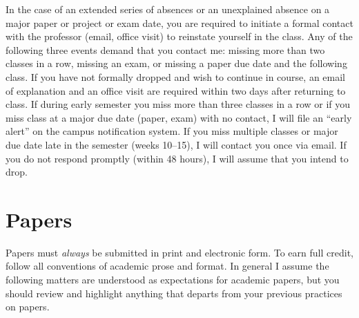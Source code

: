 \documentclass[]{article}
\begin{document}
In the case of an extended series of absences or an unexplained absence
on a major paper or project or exam date, you are required to initiate a
formal contact with the professor (email, office visit) to reinstate
yourself in the class. Any of the following three events demand that you
contact me: missing more than two classes in a row, missing an exam, or
missing a paper due date and the following class. If you have not
formally dropped and wish to continue in course, an email of explanation
and an office visit are required within two days after returning to
class. If during early semester you miss more than three classes in a
row or if you miss class at a major due date (paper, exam) with no
contact, I will file an ``early alert'' on the campus notification
system. If you miss multiple classes or major due date late in the
semester (weeks 10--15), I will contact you once via email. If you do
not respond promptly (within 48 hours), I will assume that you intend to
drop.

\section{Papers}\label{papers}

Papers must \emph{always} be submitted in print and electronic form. To
earn full credit, follow all conventions of academic prose and format.
In general I assume the following matters are understood as expectations
for academic papers, but you should review and highlight anything that
departs from your previous practices on papers.
\end{document}

